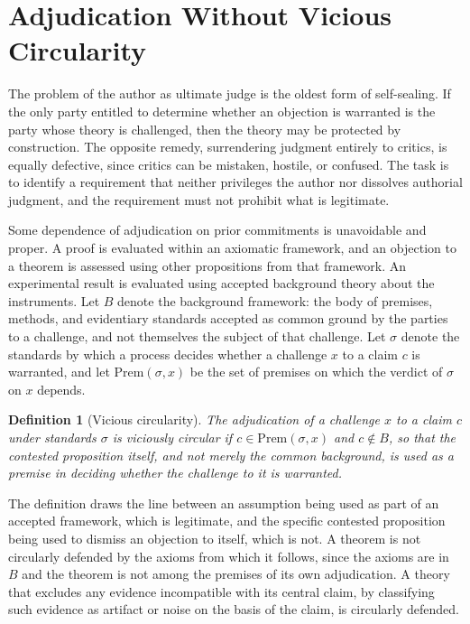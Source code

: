 \documentclass[11pt]{article}
\newtheorem{definition}{Definition}
\theoremstyle{remark}
\begin{document}
\section{Adjudication Without Vicious Circularity}
\label{sec:audit}

The problem of the author as ultimate judge is the oldest form of self-sealing. If the only party entitled to determine whether an objection is warranted is the party whose theory is challenged, then the theory may be protected by construction. The opposite remedy, surrendering judgment entirely to critics, is equally defective, since critics can be mistaken, hostile, or confused. The task is to identify a requirement that neither privileges the author nor dissolves authorial judgment, and the requirement must not prohibit what is legitimate.

Some dependence of adjudication on prior commitments is unavoidable and proper. A proof is evaluated within an axiomatic framework, and an objection to a theorem is assessed using other propositions from that framework. An experimental result is evaluated using accepted background theory about the instruments. Let $B$ denote the background framework: the body of premises, methods, and evidentiary standards accepted as common ground by the parties to a challenge, and not themselves the subject of that challenge. Let $\sigma$ denote the standards by which a process decides whether a challenge $x$ to a claim $c$ is warranted, and let $\mathrm{Prem}(\sigma,x)$ be the set of premises on which the verdict of $\sigma$ on $x$ depends.

\begin{definition}[Vicious circularity]
The adjudication of a challenge $x$ to a claim $c$ under standards $\sigma$ is viciously circular if $c\in\mathrm{Prem}(\sigma,x)$ and $c\notin B$, so that the contested proposition itself, and not merely the common background, is used as a premise in deciding whether the challenge to it is warranted.
\end{definition}

The definition draws the line between an assumption being used as part of an accepted framework, which is legitimate, and the specific contested proposition being used to dismiss an objection to itself, which is not. A theorem is not circularly defended by the axioms from which it follows, since the axioms are in $B$ and the theorem is not among the premises of its own adjudication. A theory that excludes any evidence incompatible with its central claim, by classifying such evidence as artifact or noise on the basis of the claim, is circularly defended.
\end{document}

